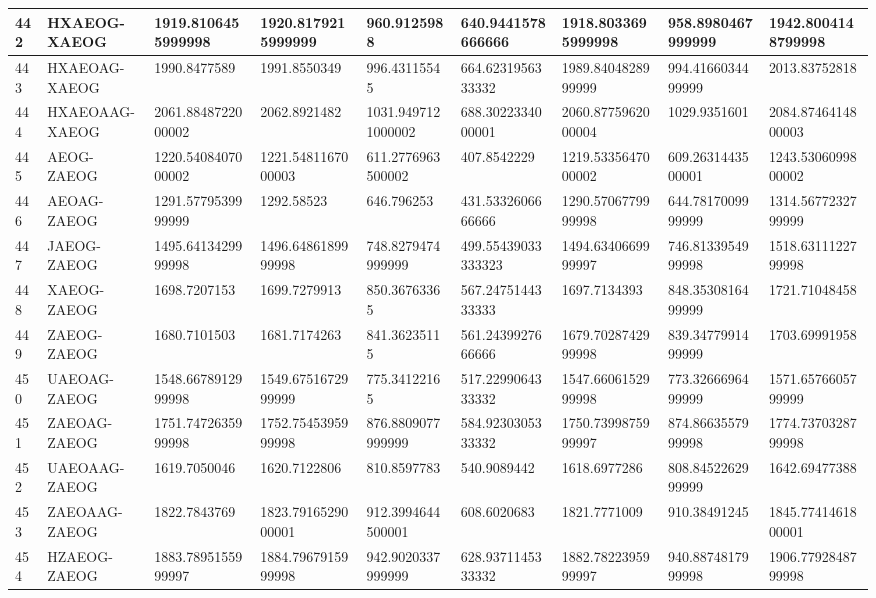 {\begin{longtable}{|l|l|l|l|l|l|l|l|l|}
        442 & HXAEOG-XAEOG & 1919.8106455999998 & 1920.8179215999999 & 960.9125988 & 640.9441578666666 & 1918.8033695999998 & 958.8980467999999 & 1942.8004148799998 \\ \hline
        443 & HXAEOAG-XAEOG & 1990.8477589 & 1991.8550349 & 996.43115545 & 664.6231956333332 & 1989.8404828999999 & 994.4166034499999 & 2013.83752818 \\ \hline
        444 & HXAEOAAG-XAEOG & 2061.8848722000002 & 2062.8921482 & 1031.9497121000002 & 688.3022334000001 & 2060.8775962000004 & 1029.9351601 & 2084.8746414800003 \\ \hline
        445 & AEOG-ZAEOG & 1220.5408407000002 & 1221.5481167000003 & 611.2776963500002 & 407.8542229 & 1219.5335647000002 & 609.2631443500001 & 1243.5306099800002 \\ \hline
        446 & AEOAG-ZAEOG & 1291.5779539999999 & 1292.58523 & 646.796253 & 431.5332606666666 & 1290.5706779999998 & 644.7817009999999 & 1314.5677232799999 \\ \hline
        447 & JAEOG-ZAEOG & 1495.6413429999998 & 1496.6486189999998 & 748.8279474999999 & 499.55439033333323 & 1494.6340669999997 & 746.8133954999998 & 1518.6311122799998 \\ \hline
        448 & XAEOG-ZAEOG & 1698.7207153 & 1699.7279913 & 850.36763365 & 567.2475144333333 & 1697.7134393 & 848.3530816499999 & 1721.71048458 \\ \hline
        449 & ZAEOG-ZAEOG & 1680.7101503 & 1681.7174263 & 841.36235115 & 561.2439927666666 & 1679.7028742999998 & 839.3477991499999 & 1703.69991958 \\ \hline
        450 & UAEOAG-ZAEOG & 1548.6678912999998 & 1549.6751672999999 & 775.34122165 & 517.2299064333332 & 1547.6606152999998 & 773.3266696499999 & 1571.6576605799999 \\ \hline
        451 & ZAEOAG-ZAEOG & 1751.7472635999998 & 1752.7545395999998 & 876.8809077999999 & 584.9230305333332 & 1750.7399875999997 & 874.8663557999998 & 1774.7370328799998 \\ \hline
        452 & UAEOAAG-ZAEOG & 1619.7050046 & 1620.7122806 & 810.8597783 & 540.9089442 & 1618.6977286 & 808.8452262999999 & 1642.69477388 \\ \hline
        453 & ZAEOAAG-ZAEOG & 1822.7843769 & 1823.7916529000001 & 912.3994644500001 & 608.6020683 & 1821.7771009 & 910.38491245 & 1845.7741461800001 \\ \hline
        454 & HZAEOG-ZAEOG & 1883.7895155999997 & 1884.7967915999998 & 942.9020337999999 & 628.9371145333332 & 1882.7822395999997 & 940.8874817999998 & 1906.7792848799998 \\ \hline

\end{longtable}}
